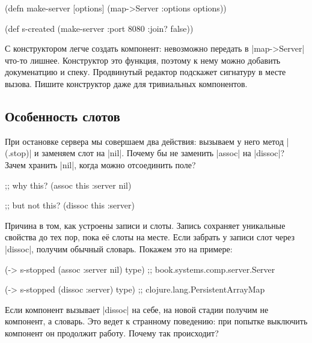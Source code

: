 \begin{english}
  \begin{clojure}
(defn make-server
  [options]
  (map->Server {:options options}))

(def s-created (make-server {:port 8080 :join? false}))
  \end{clojure}
\end{english}

С конструктором легче создать компонент: невозможно передать в
\spverb|map->Server| что-то лишнее. Конструктор это функция, поэтому к нему
можно добавить докуменатцию и спеку. Продвинутый редактор подскажет сигнатуру в
месте вызова. Пишите конструктор даже для тривиальных компонентов.

\subsection{Особенность слотов}

При остановке сервера мы совершаем два действия: вызываем у него метод
\spverb|(.stop)| и заменяем слот на \spverb|nil|. Почему бы не заменить
\spverb|assoc| на \spverb|dissoc|? Зачем хранить \spverb|nil|, когда можно
отсоединить поле?

\begin{english}
  \begin{clojure}
;; why this?
(assoc this :server nil)

;; but not this?
(dissoc this :server)
  \end{clojure}
\end{english}

Причина в том, как устроены записи и слоты. Запись сохраняет уникальные свойства
до тех пор, пока е\"{е} слоты на месте. Если забрать у записи слот через
\spverb|dissoc|, получим обычный словарь. Покажем это на примере:

\begin{english}
  \begin{clojure}
(-> s-stopped (assoc :server nil) type)
;; book.systems.comp.server.Server

(-> s-stopped (dissoc :server) type)
;; clojure.lang.PersistentArrayMap
  \end{clojure}
\end{english}

Если компонент вызывает \spverb|dissoc| на себе, на новой стадии получим не
компонент, а словарь. Это ведет к странному поведению: при попытке выключить
компонент он продолжит работу. Почему так происходит?

